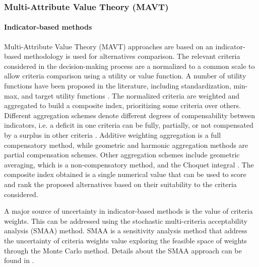 \begin{refsection}[referencesCh1]
\subsubsection{Multi-Attribute Value Theory (MAVT)}
\paragraph{Indicator-based methods}
Multi-Attribute Value Theory (MAVT) approaches are based on an indicator-based methodology is used for alternatives comparison. The relevant criteria considered in the decision-making process are a normalized to a common scale to allow criteria comparison using a utility or value function. A number of utility functions have been proposed in the literature, including standardization, min-max, and target utility functions \citep{HandbookCompositeIndicators}. 
The normalized criteria 
are weighted and aggregated to build a composite index, prioritizing some criteria over others. Different aggregation schemes denote different degrees of compensability between indicators, i.e. a deficit in one criteria can be fully, partially, or not compensated by a surplus in other criteria \citep{MarcoCinelli2020}. Additive weighting aggregation is a full compensatory method, while geometric and  harmonic aggregation methods are partial  compensation schemes. Other aggregation schemes include geometric averaging, which is a non-compensatory method, and the Choquet integral \citep{marichal2000determination}. The composite index obtained is a single numerical value that can be used to score and rank the proposed alternatives based on their suitability to the criteria considered. 

A major source of uncertainty in indicator-based methods is the value of criteria weights. This can be addressed using the stochastic multi-criteria acceptability analysis (SMAA) method. SMAA is a sensitivity analysis method that address the uncertainty of criteria weights value exploring the feasible space of weights through the Monte Carlo method. Details about the SMAA approach can be found in \citet{tervonen_implementing_2007}.



\end{refsection}
